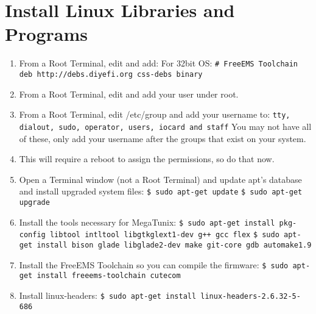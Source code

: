 \documentclass[12pt,notitlepage,onecolumn,oneside,openany,draft]{memoir}
\begin{document}
\chapter{\textsf{Install Linux Libraries and Programs}}

\begin{enumerate}
\item \textsf{From a Root Terminal, edit  and add:} \newline
	\textsf{For 32bit OS:} \newline
\texttt{\# FreeEMS Toolchain} \newline
\texttt{deb http://debs.diyefi.org css-debs binary}

\item \textsf{From a Root Terminal, edit  and add your user under root.}

\item \textsf{From a Root Terminal, edit /etc/group and add your username to:} \newline
      \texttt{tty, dialout, sudo, operator, users, iocard and staff} \newline
      \textsf{You may not have all of these, only add your username after the groups that exist on your system.}

\item \textsf{This will require a reboot to assign the permissions, so do that now.}

\item \textsf{Open a Terminal window (not a Root Terminal) and update apt's database and install upgraded system files:} \newline
      \texttt{\$ sudo apt-get update} \newline
      \texttt{\$ sudo apt-get upgrade}

\item \textsf{Install the tools necessary for MegaTunix:} \newline
      \texttt{\$ sudo apt-get install pkg-config libtool intltool libgtkglext1-dev g++ gcc flex} \newline
      \texttt{\$ sudo apt-get install bison glade libglade2-dev make git-core gdb automake1.9}

\item \textsf{Install the FreeEMS Toolchain so you can compile the firmware:} \newline
      \texttt{\$ sudo apt-get install freeems-toolchain cutecom}

\item \textsf{Install linux-headers:} \newline
      \texttt{\$ sudo apt-get install linux-headers-2.6.32-5-686}
\end{enumerate}
\end{document}
